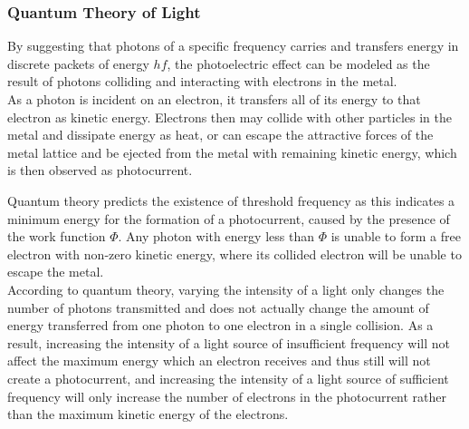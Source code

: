 \documentclass[../main]{subfiles}
\begin{document}
	\subsubsection{Quantum Theory of Light}



	By suggesting that photons of a specific frequency carries and transfers energy in discrete packets of energy \(hf\), the photoelectric effect can be modeled as the result of photons colliding and interacting with electrons in the metal. \\

	As a photon is incident on an electron, it transfers all of its energy to that electron as kinetic energy. Electrons then may collide with other particles in the metal and dissipate energy as heat, or can escape the attractive forces of the metal lattice and be ejected from the metal with remaining kinetic energy, which is then observed as photocurrent. \\



	Quantum theory predicts the existence of threshold frequency as this indicates a minimum energy for the formation of a photocurrent, caused by the presence of the work function \(\Phi\). Any photon with energy less than \(\Phi\) is unable to form a free electron with non-zero kinetic energy, where its collided electron will be unable to escape the metal. \\

	According to quantum theory, varying the intensity of a light only changes the number of photons transmitted and does not actually change the amount of energy transferred from one photon to one electron in a single collision. As a result, increasing the intensity of a light source of insufficient frequency will not affect the maximum energy which an electron receives and thus still will not create a photocurrent, and increasing the intensity of a light source of sufficient frequency will only increase the number of electrons in the photocurrent rather than the maximum kinetic energy of the electrons. \\
\end{document}

